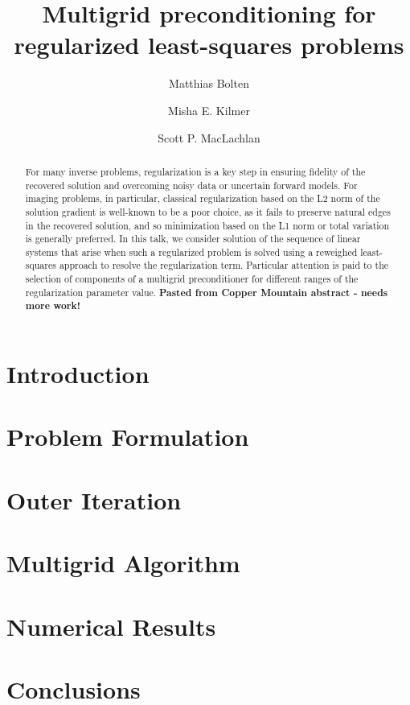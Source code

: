 \documentclass[review]{siamart171218}
\title{Multigrid preconditioning for regularized least-squares problems}
\author{Matthias Bolten \and Misha E. Kilmer \and Scott P. MacLachlan}
\begin{document}
\maketitle

\begin{abstract}
For many inverse problems, regularization is a key step in ensuring
fidelity of the recovered solution and overcoming noisy data or
uncertain forward models. For imaging problems, in particular,
classical regularization based on the L2 norm of the solution gradient
is well-known to be a poor choice, as it fails to preserve natural
edges in the recovered solution, and so minimization based on the L1
norm or total variation is generally preferred. In this talk, we
consider solution of the sequence of linear systems that arise when
such a regularized problem is solved using a reweighed least-squares
approach to resolve the regularization term. Particular attention is
paid to the selection of components of a multigrid preconditioner for
different ranges of the regularization parameter value.  {\bf Pasted
  from Copper Mountain abstract - needs more work!}
\end{abstract}


\section{Introduction}


\section{Problem Formulation}


\section{Outer Iteration}


\section{Multigrid Algorithm}\label{sec:multigrid}



\section{Numerical Results}\label{sec:numerical}


\section{Conclusions}

 
\end{document}
